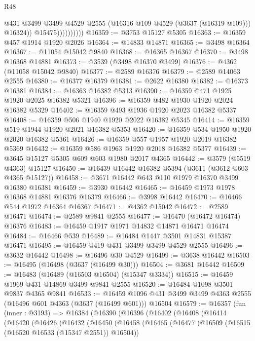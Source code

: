 \begin{lexlean}{R48}
\begin{coremodule}
                            @431
                            @3499
                            @3499
                            @4529
                            @2555
                            (@16316 @109 @4529 (@3637 (@16319 @109)))
                            @16324))
                        @15475))))))))))
@16359 := @3753 @15127 @5305
@16363 := @16359 @457 @1914 @1920 @2026
@16364 := @14833 @14871
@16365 := @3498 @16364
@16367 := @11054 @15042 @9840
@16368 := @16365 @16367
@16370 := @3498 @16368 @14881
@16373 := @3539 (@3498 @16370 @3499)
@16376 := @4362 (@11058 @15042 @9840)
@16377 := @2589 @16376
@16379 := @2589 @14063 @2555
@16380 := @16377 @16379
@16381 := @2622 @16380
@16382 := @16373 @16381
@16384 := @16363 @16382 @5313
@16390 := @16359 @471 @1925 @1920 @2025 @16382 @5321
@16396 := @16359 @482 @1930 @1920 @2024 @16382 @5329
@16402 := @16359 @493 @1936 @1920 @2023 @16382 @5337
@16408 := @16359 @506 @1940 @1920 @2022 @16382 @5345
@16414 := @16359 @519 @1944 @1920 @2021 @16382 @5353
@16420 := @16359 @534 @1950 @1920 @2020 @16382 @5361
@16426 := @16359 @557 @1957 @1920 @2019 @16382 @5369
@16432 := @16359 @586 @1963 @1920 @2018 @16382 @5377
@16439 := @3645 @15127 @5305 @609 @603 @1980 @2017 @4365
@16442 := @3579 (@5519 @4363) @15127
@16450 := @16439 @16442 @16382 @5394 (@3611 (@3612 @603 @4365 @15127))
@16458 := @3671 @16442 @643 @110 @1979 @16370 @3499 @16380 @16381
@16459 := @3930 @16442
@16465 := @16459 @1973 @1978 @16368 @14881 @16376 @16379
@16466 := @3998 @16442
@16470 := @16466 @544 @1972 @16364 @16367
@16471 := @4362 @15042
@16472 := @2589 @16471
@16474 := @2589 @9841 @2555
@16477 := @16470 (@16472 @16474) @16376
@16483 := @16459 @1917 @1971 @14832 @14871 @16471 @16474
@16484 := @16466 @539
@16489 := @16484 @1447 @3501 @14831 @15387 @16471
@16495 := @16459 @419 @431 @3499 @3499 @4529 @2555
@16496 := @3632 @16442
@16498 := @16496 @30 @4529
@16499 := @3638 @16442
@16503 := @16495 (@16498 (@3637 (@16499 @30)))
@16504 := @3681 @16442
@16509 := @16483 (@16489 (@16503 @16504) (@15347 @3334))
@16515 := @16459 @1969 @431 @14869 @3499 @9841 @2555
@16520 := @16484 @1098 @3501 @9837 @4365 @9841
@16533 := @16459 @1096 @431 @3499 @3499 @4363 @2555 (@16496 @601 @4363 (@3637 (@16499 @601))) @16504
@16579 := @16357
    (fun (inner : @3193) =>
    @16384
      (@16390
        (@16396
          (@16402
            (@16408
              (@16414
                (@16420
                  (@16426
                    (@16432
                      (@16450
                        (@16458
                          (@16465
                            (@16477
                              (@16509 (@16515 (@16520 @16533 (@15347 @2551)) @16504))

\end{coremodule}
\end{lexlean}
